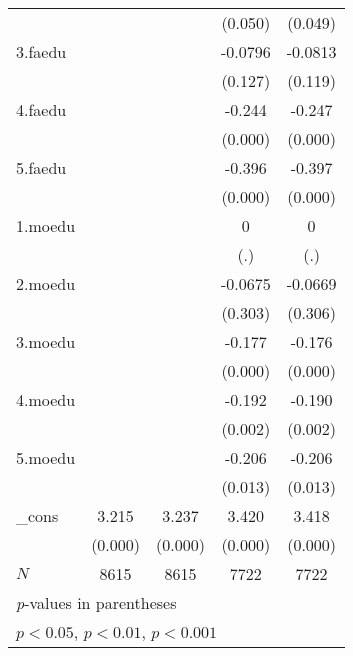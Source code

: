 {\begin{tabular}{l*{4}{c}}
            &                     &                     &     (0.050)         &     (0.049)         \\
[1em]
3.faedu     &                     &                     &     -0.0796         &     -0.0813         \\
            &                     &                     &     (0.127)         &     (0.119)         \\
[1em]
4.faedu     &                     &                     &      -0.244\sym{***}&      -0.247\sym{***}\\
            &                     &                     &     (0.000)         &     (0.000)         \\
[1em]
5.faedu     &                     &                     &      -0.396\sym{***}&      -0.397\sym{***}\\
            &                     &                     &     (0.000)         &     (0.000)         \\
[1em]
1.moedu     &                     &                     &           0         &           0         \\
            &                     &                     &         (.)         &         (.)         \\
[1em]
2.moedu     &                     &                     &     -0.0675         &     -0.0669         \\
            &                     &                     &     (0.303)         &     (0.306)         \\
[1em]
3.moedu     &                     &                     &      -0.177\sym{***}&      -0.176\sym{***}\\
            &                     &                     &     (0.000)         &     (0.000)         \\
[1em]
4.moedu     &                     &                     &      -0.192\sym{**} &      -0.190\sym{**} \\
            &                     &                     &     (0.002)         &     (0.002)         \\
[1em]
5.moedu     &                     &                     &      -0.206\sym{*}  &      -0.206\sym{*}  \\
            &                     &                     &     (0.013)         &     (0.013)         \\
[1em]
\_cons      &       3.215\sym{***}&       3.237\sym{***}&       3.420\sym{***}&       3.418\sym{***}\\
            &     (0.000)         &     (0.000)         &     (0.000)         &     (0.000)         \\
\hline
\(N\)       &        8615         &        8615         &        7722         &        7722         \\
\hline\hline
\multicolumn{5}{l}{\footnotesize \textit{p}-values in parentheses}\\
\multicolumn{5}{l}{\footnotesize \sym{*} \(p<0.05\), \sym{**} \(p<0.01\), \sym{***} \(p<0.001\)}\\
\end{tabular}
}
